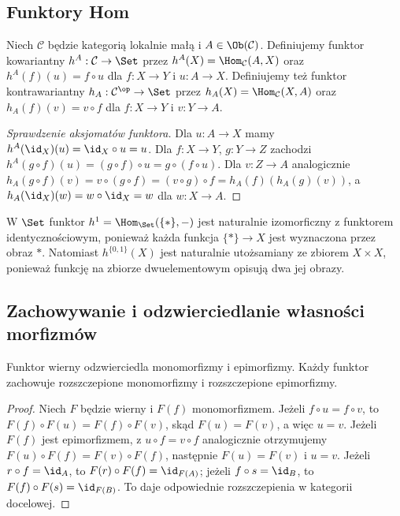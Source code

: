 \subsection{Funktory Hom}

\begin{definicja}\label{def:hom-funktory}
Niech $\mathcal C$ będzie kategorią lokalnie małą i $A\in\Ob(\mathcal C)$. Definiujemy funktor kowariantny $h^A:\mathcal C\to\Set$ przez $h^A(X)=\Hom_{\mathcal C}(A,X)$ oraz $h^A(f)(u)=f\circ u$ dla $f:X\to Y$ i $u:A\to X$. Definiujemy też funktor kontrawariantny $h_A:\mathcal C^{\op}\to\Set$ przez $h_A(X)=\Hom_{\mathcal C}(X,A)$ oraz $h_A(f)(v)=v\circ f$ dla $f:X\to Y$ i $v:Y\to A$.
\end{definicja}

\begin{proof}[Sprawdzenie aksjomatów funktora]
Dla $u:A\to X$ mamy $h^A(\id_X)(u)=\id_X\circ u=u$. Dla $f:X\to Y$, $g:Y\to Z$ zachodzi $h^A(g\circ f)(u)=(g\circ f)\circ u=g\circ(f\circ u)$. Dla $v:Z\to A$ analogicznie $h_A(g\circ f)(v)=v\circ(g\circ f)=(v\circ g)\circ f=h_A(f)(h_A(g)(v))$, a $h_A(\id_X)(w)=w\circ\id_X=w$ dla $w:X\to A$.
\end{proof}

\begin{przyklad}
W $\Set$ funktor $h^1=\Hom_{\Set}(\{*\},-)$ jest naturalnie izomorficzny z funktorem identycznościowym, ponieważ każda funkcja $\{*\}\to X$ jest wyznaczona przez obraz $*$. Natomiast $h^{\{0,1\}}(X)$ jest naturalnie utożsamiany ze zbiorem $X\times X$, ponieważ funkcję na zbiorze dwuelementowym opisują dwa jej obrazy.
\end{przyklad}

\subsection{Zachowywanie i odzwierciedlanie własności morfizmów}

\begin{stwierdzenie}\label{cat:prop:faithful-reflect}
Funktor wierny odzwierciedla monomorfizmy i epimorfizmy. Każdy funktor zachowuje rozszczepione monomorfizmy i rozszczepione epimorfizmy.
\end{stwierdzenie}
\begin{proof}
Niech $F$ będzie wierny i $F(f)$ monomorfizmem. Jeżeli $f\circ u=f\circ v$, to $F(f)\circ F(u)=F(f)\circ F(v)$, skąd $F(u)=F(v)$, a więc $u=v$. Jeżeli $F(f)$ jest epimorfizmem, z $u\circ f=v\circ f$ analogicznie otrzymujemy $F(u)\circ F(f)=F(v)\circ F(f)$, następnie $F(u)=F(v)$ i $u=v$. Jeżeli $r\circ f=\id_A$, to $F(r)\circ F(f)=\id_{F(A)}$; jeżeli $f\circ s=\id_B$, to $F(f)\circ F(s)=\id_{F(B)}$. To daje odpowiednie rozszczepienia w kategorii docelowej.
\end{proof}

